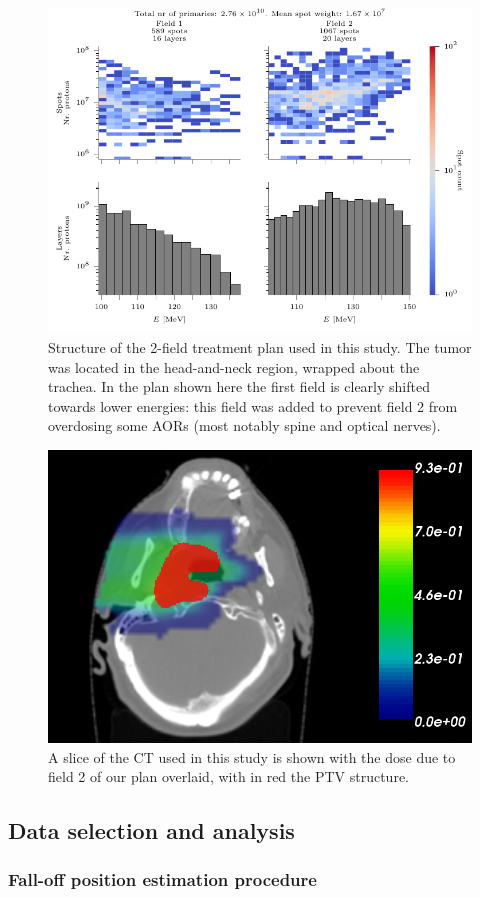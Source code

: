 \documentclass[a4paper,english]{article}
\begin{document}
\begin{figure}[htp]
  \centering
  \includegraphics[width=0.9\linewidth]{plannonorm-plot}
  \caption{Structure of the 2-field treatment plan used in this study. The tumor was located in the head-and-neck region, wrapped about the trachea. In the plan shown here the first field is clearly shifted towards lower energies: this field was added to prevent field 2 from overdosing some AORs (most notably spine and optical nerves).}
  \label{fig:our-plan}
\end{figure}

\begin{figure}[htp]
  \centering
  \includegraphics[width=0.5\linewidth]{ourpatient}
  \caption{A slice of the CT used in this study is shown with the dose due to field 2 of our plan overlaid, with in red the PTV structure.}
  \label{fig:our-patient}
\end{figure}

\subsection{Data selection and analysis}

\subsubsection{Fall-off position estimation procedure}\label{sec:fopproc}
\end{document}
